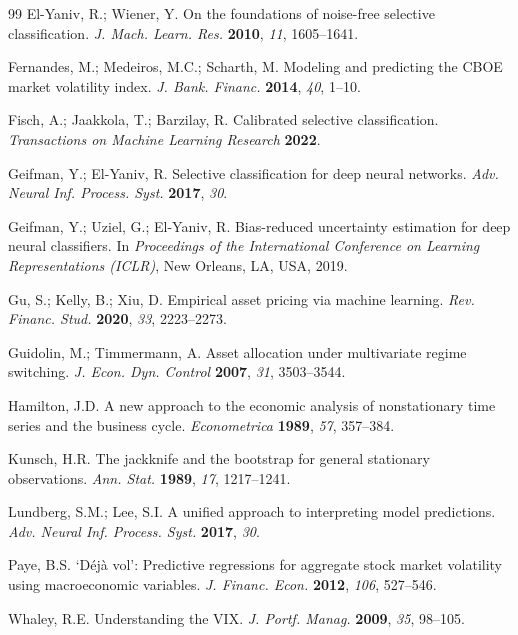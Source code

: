 \documentclass[12pt]{article}
\begin{document}
\begin{thebibliography}{99}
El-Yaniv, R.; Wiener, Y.
On the foundations of noise-free selective classification.
\textit{J. Mach. Learn. Res.} \textbf{2010}, \textit{11}, 1605--1641.

Fernandes, M.; Medeiros, M.C.; Scharth, M.
Modeling and predicting the CBOE market volatility index.
\textit{J. Bank. Financ.} \textbf{2014}, \textit{40}, 1--10.

Fisch, A.; Jaakkola, T.; Barzilay, R.
Calibrated selective classification.
\textit{Transactions on Machine Learning Research} \textbf{2022}.

Geifman, Y.; El-Yaniv, R.
Selective classification for deep neural networks.
\textit{Adv. Neural Inf. Process. Syst.} \textbf{2017}, \textit{30}.

Geifman, Y.; Uziel, G.; El-Yaniv, R.
Bias-reduced uncertainty estimation for deep neural classifiers.
In \textit{Proceedings of the International Conference on Learning Representations (ICLR)},
New Orleans, LA, USA, 2019.

Gu, S.; Kelly, B.; Xiu, D.
Empirical asset pricing via machine learning.
\textit{Rev. Financ. Stud.} \textbf{2020}, \textit{33}, 2223--2273.

Guidolin, M.; Timmermann, A.
Asset allocation under multivariate regime switching.
\textit{J. Econ. Dyn. Control} \textbf{2007}, \textit{31}, 3503--3544.

Hamilton, J.D.
A new approach to the economic analysis of nonstationary time series and the business cycle.
\textit{Econometrica} \textbf{1989}, \textit{57}, 357--384.

Kunsch, H.R.
The jackknife and the bootstrap for general stationary observations.
\textit{Ann. Stat.} \textbf{1989}, \textit{17}, 1217--1241.

Lundberg, S.M.; Lee, S.I.
A unified approach to interpreting model predictions.
\textit{Adv. Neural Inf. Process. Syst.} \textbf{2017}, \textit{30}.

Paye, B.S.
`D\'ej\`a vol': Predictive regressions for aggregate stock market volatility using
macroeconomic variables.
\textit{J. Financ. Econ.} \textbf{2012}, \textit{106}, 527--546.

Whaley, R.E.
Understanding the VIX.
\textit{J. Portf. Manag.} \textbf{2009}, \textit{35}, 98--105.

\end{thebibliography}
\end{document}
